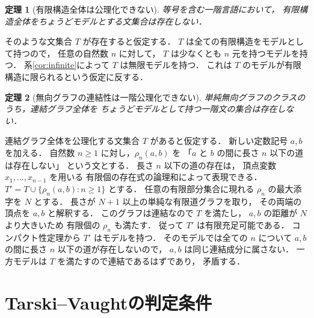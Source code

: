 \documentclass[a5paper,10pt,onecolumn]{jsarticle}
\makeatletter
\theoremstyle{mathnotetheorem}
\newtheorem{theorem}{定理}[section]
\renewcommand{\proofname}{証明}
\renewenvironment{proof}[1][\proofname]{%
  \par\pushQED{\qed}\normalfont\topsep4\p@\@plus2\p@\relax
  \trivlist\item[\hskip\labelsep\bfseries #1]\ignorespaces
}{\popQED\endtrivlist\@endpefalse}
\makeatother
\begin{document}
\begin{theorem}[有限構造全体は公理化できない]
\label{thm:finiteness}
等号を含む一階言語において，
有限構造全体をちょうどモデルとする文集合は存在しない．
\end{theorem}
\begin{proof}
そのような文集合 $T$ が存在すると仮定する．
$T$ は全ての有限構造をモデルとして持つので，
任意の自然数 $n$ に対して，
$T$ は少なくとも $n$ 元を持つモデルを持つ．
系\ref{cor:infinite}によって $T$ は無限モデルを持つ．
これは $T$ のモデルが有限構造に限られるという仮定に反する．
\end{proof}

\begin{theorem}[無向グラフの連結性は一階公理化できない]
\label{thm:connectivity}
単純無向グラフのクラスのうち，連結グラフ全体を
ちょうどモデルとして持つ一階文の集合は存在しない．
\end{theorem}
\begin{proof}
連結グラフ全体を公理化する文集合 $T$ があると仮定する．
新しい定数記号 $a,b$ を加える．
自然数 $n\ge1$ に対し，$\rho_n(a,b)$ を
「$a$ と $b$ の間に長さ $n$ 以下の道は存在しない」
という文とする．
長さ $n$ 以下の道の存在は，
頂点変数 $x_1,\dots,x_{n-1}$ を用いる
有限個の存在式の論理和によって表現できる．
$T'=T\cup\{\rho_n(a,b):n\ge1\}$ とする．
任意の有限部分集合に現れる $\rho_n$ の最大添字を $N$ とする．
長さが $N+1$ 以上の単純な有限道グラフを取り，
その両端の頂点を $a,b$ と解釈する．
このグラフは連結なので $T$ を満たし，
$a,b$ の距離が $N$ より大きいため
有限個の $\rho_n$ も満たす．
従って $T'$ は有限充足可能である．
コンパクト性定理から $T'$ はモデルを持つ．
そのモデルでは全ての $n$ について
$a,b$ の間に長さ $n$ 以下の道が存在しないので，
$a,b$ は同じ連結成分に属さない．
一方モデルは $T$ を満たすので連結であるはずであり，
矛盾する．
\end{proof}

\section{Tarski--Vaughtの判定条件}
\end{document}
